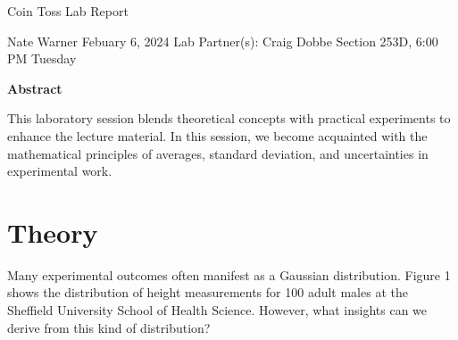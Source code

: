 \documentclass{report}
\title{\Huge{}}
\author{\huge{Nathan Warner}}
\date{\huge{}}
\begin{document}
    \begin{center}
        \begin{Huge}
            Coin Toss Lab Report
        \end{Huge}
        \begin{Large}
            \bigbreak \noindent 
            Nate Warner
            \smallbreak \noindent
            Febuary 6, 2024
            \smallbreak \noindent
            Lab Partner(s): Craig Dobbe
            \bigbreak \noindent 
            Section 253D, 6:00 PM Tuesday 
        \end{Large}
    \end{center}
    \pagebreak 
    \tableofcontents
    \pagebreak 
    \begin{center}
        \textbf{Abstract}
    \end{center}
    \begin{adjustwidth}{.3in}{.3in}
        \hspace{\parindent} This laboratory session blends theoretical concepts with practical experiments to enhance the lecture material. In this session, we become acquainted with the mathematical principles of averages, standard deviation, and uncertainties in experimental work.
    \end{adjustwidth}
    
    \bigbreak \noindent 
    \section{Theory}
    \bigbreak \noindent 
    \bigbreak \noindent 
    Many experimental outcomes often manifest as a Gaussian distribution. Figure 1 shows the distribution of height measurements for 100 adult males at the Sheffield University School of Health Science. However, what insights can we derive from this kind of distribution? 
\end{document}

